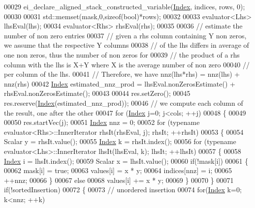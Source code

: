 \begin{DoxyCode}
00029   ei\_declare\_aligned\_stack\_constructed\_variable(\hyperlink{namespace_eigen_a62e77e0933482dafde8fe197d9a2cfde}{Index},  indices,  rows, 0);
00030   
00031   std::memset(mask,0,\textcolor{keyword}{sizeof}(\textcolor{keywordtype}{bool})*rows);
00032 
00033   evaluator<Lhs> lhsEval(lhs);
00034   evaluator<Rhs> rhsEval(rhs);
00035   
00036   \textcolor{comment}{// estimate the number of non zero entries}
00037   \textcolor{comment}{// given a rhs column containing Y non zeros, we assume that the respective Y columns}
00038   \textcolor{comment}{// of the lhs differs in average of one non zeros, thus the number of non zeros for}
00039   \textcolor{comment}{// the product of a rhs column with the lhs is X+Y where X is the average number of non zero}
00040   \textcolor{comment}{// per column of the lhs.}
00041   \textcolor{comment}{// Therefore, we have nnz(lhs*rhs) = nnz(lhs) + nnz(rhs)}
00042   \hyperlink{namespace_eigen_a62e77e0933482dafde8fe197d9a2cfde}{Index} estimated\_nnz\_prod = lhsEval.nonZerosEstimate() + rhsEval.nonZerosEstimate();
00043 
00044   res.setZero();
00045   res.reserve(\hyperlink{namespace_eigen_a62e77e0933482dafde8fe197d9a2cfde}{Index}(estimated\_nnz\_prod));
00046   \textcolor{comment}{// we compute each column of the result, one after the other}
00047   \textcolor{keywordflow}{for} (\hyperlink{namespace_eigen_a62e77e0933482dafde8fe197d9a2cfde}{Index} j=0; j<cols; ++j)
00048   \{
00049 
00050     res.startVec(j);
00051     \hyperlink{namespace_eigen_a62e77e0933482dafde8fe197d9a2cfde}{Index} nnz = 0;
00052     \textcolor{keywordflow}{for} (\textcolor{keyword}{typename} evaluator<Rhs>::InnerIterator rhsIt(rhsEval, j); rhsIt; ++rhsIt)
00053     \{
00054       Scalar y = rhsIt.value();
00055       \hyperlink{namespace_eigen_a62e77e0933482dafde8fe197d9a2cfde}{Index} k = rhsIt.index();
00056       \textcolor{keywordflow}{for} (\textcolor{keyword}{typename} evaluator<Lhs>::InnerIterator lhsIt(lhsEval, k); lhsIt; ++lhsIt)
00057       \{
00058         \hyperlink{namespace_eigen_a62e77e0933482dafde8fe197d9a2cfde}{Index} i = lhsIt.index();
00059         Scalar x = lhsIt.value();
00060         \textcolor{keywordflow}{if}(!mask[i])
00061         \{
00062           mask[i] = \textcolor{keyword}{true};
00063           values[i] = x * y;
00064           indices[nnz] = i;
00065           ++nnz;
00066         \}
00067         \textcolor{keywordflow}{else}
00068           values[i] += x * y;
00069       \}
00070     \}
00071     \textcolor{keywordflow}{if}(!sortedInsertion)
00072     \{
00073       \textcolor{comment}{// unordered insertion}
00074       \textcolor{keywordflow}{for}(\hyperlink{namespace_eigen_a62e77e0933482dafde8fe197d9a2cfde}{Index} k=0; k<nnz; ++k)

\end{DoxyCode}
